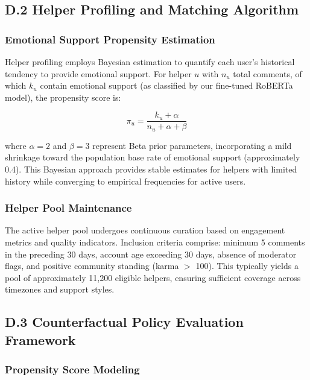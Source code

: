 \documentclass[letterpaper]{article} %
\begin{document}
\subsection{D.2 Helper Profiling and Matching Algorithm}

\subsubsection{Emotional Support Propensity Estimation}

Helper profiling employs Bayesian estimation to quantify each user's historical tendency to provide emotional support. For helper $u$ with $n_u$ total comments, of which $k_u$ contain emotional support (as classified by our fine-tuned RoBERTa model), the propensity score is:

\begin{equation}
\pi_u = \frac{k_u + \alpha}{n_u + \alpha + \beta}
\end{equation}

where $\alpha = 2$ and $\beta = 3$ represent Beta prior parameters, incorporating a mild shrinkage toward the population base rate of emotional support (approximately 0.4). This Bayesian approach provides stable estimates for helpers with limited history while converging to empirical frequencies for active users.

\subsubsection{Helper Pool Maintenance}

The active helper pool undergoes continuous curation based on engagement metrics and quality indicators. Inclusion criteria comprise: minimum 5 comments in the preceding 30 days, account age exceeding 30 days, absence of moderator flags, and positive community standing (karma $>$ 100). This typically yields a pool of approximately 11,200 eligible helpers, ensuring sufficient coverage across timezones and support styles.

\subsection{D.3 Counterfactual Policy Evaluation Framework}

\subsubsection{Propensity Score Modeling}
\end{document}
